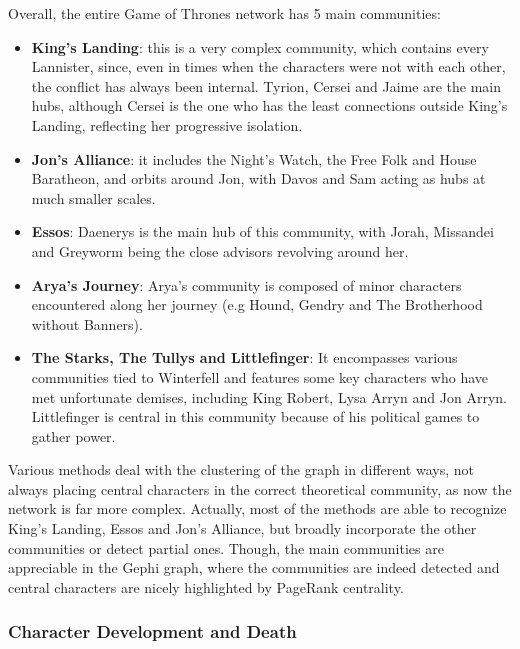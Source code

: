 \documentclass[10pt,twocolumn,letterpaper]{article}
\begin{document}
Overall, the entire Game of Thrones network has 5 main communities:

\begin{itemize}
    \item \textbf{King's Landing}: this is a very complex community, which contains every Lannister, since, even in times when the characters were not with each other, the conflict has always been internal. Tyrion, Cersei and Jaime are the main hubs, although Cersei is the one who has the least connections outside King's Landing, reflecting her progressive isolation.
    \item \textbf{Jon's Alliance}: it includes the Night’s Watch, the Free Folk and House Baratheon, and orbits around Jon, with Davos and Sam acting as hubs at much smaller scales.
    \item \textbf{Essos}: Daenerys is the main hub of this community, with Jorah, Missandei and Greyworm being the close advisors revolving around her. 
    \item \textbf{Arya's Journey}: Arya's community is composed of minor characters encountered along her journey (e.g Hound, Gendry and The Brotherhood without Banners).
    \item \textbf{The Starks, The Tullys and Littlefinger}: It encompasses various communities tied to Winterfell and features some key characters who have met unfortunate demises, including King Robert, Lysa Arryn and Jon Arryn. Littlefinger is central in this community because of his political games to gather power.
\end{itemize}

Various methods deal with the clustering of the graph in different ways, not always placing central characters in the correct theoretical community, as now the network is far more complex. Actually, most of the methods are able to recognize King's Landing, Essos and Jon's Alliance, but broadly incorporate the other communities or detect partial ones. Though, the main communities are appreciable in the Gephi graph, where the communities are indeed detected and central characters are nicely highlighted by PageRank centrality.




\subsubsection{Character Development and Death}
\end{document}
